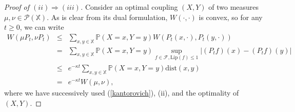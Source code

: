 \documentclass[12pt,final]{article}
\numberwithin{equation}{section}
\newcommand{\Lip}{\mathrm {Lip}}
\newcommand{\PP}{{\mathbb{P}}}
\newcommand{\cF}{\mathcal {F}}
\newcommand{\dX}{\mathbb{X}}
\newcommand{\cP}{\mathcal{P}}
\newcommand{\dist}{\mathrm{dist}}
\begin{document}
\begin{proof}[Proof of $(ii)\Longrightarrow(iii)$]Consider an optimal coupling $(X,Y)$ of two measures $\mu,\nu\in\cP(\dX)$. As is clear from its dual formulation, $W(\cdot,\cdot)$ is convex, so for any $t\ge 0$, we can write 
\begin{eqnarray*}
W\left(\mu P_t,\nu P_t\right) & \le & \sum_{x,y\in\dX}\PP(X=x,Y=y)W\left(P_t(x,\cdot),P_t(y,\cdot)\right)\\
& = & \sum_{x,y\in\dX}\PP(X=x,Y=y)\sup_{f\in\cF,\Lip(f)\le 1}\left|(P_tf)(x)-(P_tf)(y)\right|\\
& \le & e^{-\kappa t}\sum_{x,y\in\dX}\PP(X=x,Y=y)\dist(x,y)\\
& = & e^{-\kappa t}W(\mu,\nu),
\end{eqnarray*}
where we have successively used  (\ref{kantorovich}),  (ii), and the optimality of $(X,Y)$. 
\end{proof}
\end{document}
